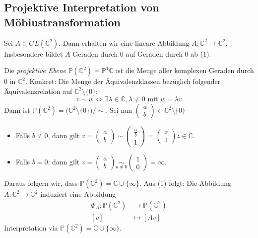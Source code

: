 \documentclass[../main.tex]{subfiles}
\begin{document}
\subsection*{Projektive Interpretation von Möbiustransformation}
Sei $A \in GL(\mathbb{C}^2)$. Dann erhalten wir eine lineare Abbildung
$A : \mathbb{C}^2 \to \mathbb{C}^2$. Insbesondere bildet $A$ Geraden durch 0 auf
Geraden durch 0 ab (1).
\begin{definition}
    Die \emph{projektive Ebene} $\mathbb{P}(\mathbb{C}^2) = \mathbb{P}^1\mathbb{C}$ ist die Menge
    aller komplexen Geraden durch 0 in $\mathbb{C}^2$. Konkret:
    Die Menge der Äquivalenzklassen bezüglich folgender Äquivalenzrelation auf $\mathbb{C}^2 \setminus \{0\}$:
    $$v \sim w \iff \exists \lambda \in \mathbb{C}, \lambda \not = 0 \text{ mit }w = \lambda v$$
    Dann ist 
    $\mathbb{P}(\mathbb{C}^2) = \big (\mathbb{C}^2 \setminus \{0\} \big ) / \sim$.
    Sei nun $\begin{pmatrix}
        a \\ b
    \end{pmatrix} \in \mathbb{C}^2 \setminus \{0\}$
    \begin{itemize}
        \item Falls $b \not = 0$, dann gilt 
        $v=\begin{pmatrix}
            a \\b
        \end{pmatrix} \sim \begin{pmatrix}
        \frac{a}{b} \\1
        \end{pmatrix} = \begin{pmatrix}
            z \\1
            \end{pmatrix}
        z \in \mathbb{C}$.

        \item Falls $b=0$, dann gilt
        $v=\begin{pmatrix}
            a \\b
        \end{pmatrix} \underset{a \not = 0}{\sim} \begin{pmatrix}
        1 \\ 0
        \end{pmatrix} = \infty$.

    \end{itemize}
    Daraus folgern wir, dass $\mathbb{P}(\mathbb{C}^2) = \mathbb{C} \cup \{ \infty \}$.
    Aus (1) folgt: Die Abbildung $A : \mathbb{C}^2 \to \mathbb{C}^2$ induziert eine Abbildung
    \begin{align*}
        \Phi _A : \mathbb{P}(\mathbb{C}^2) & \to \mathbb{P}(\mathbb{C}^2) \\
        [v] & \mapsto [Av]
    \end{align*}
    Interpretation via $\mathbb{P}(\mathbb{C}^2) = \mathbb{C} \cup  \{ \infty \}$.


\end{definition}
\end{document}
